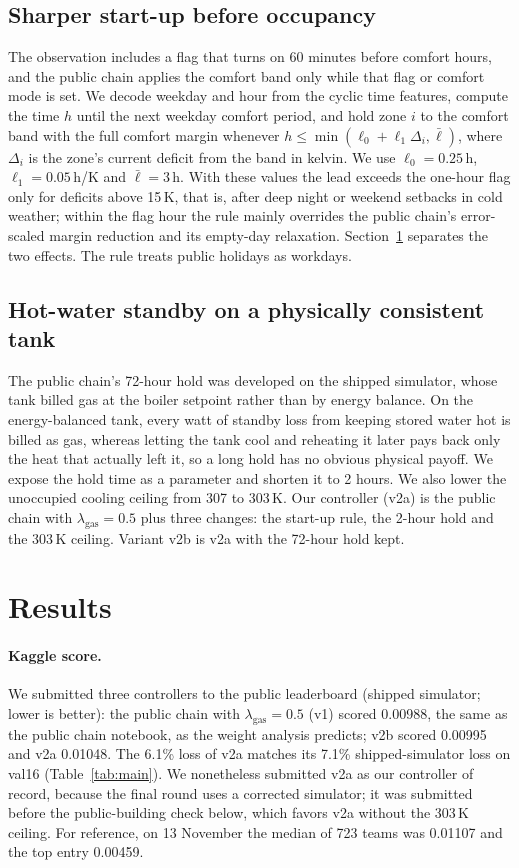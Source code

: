 \documentclass{article}
\begin{document}
\subsection{Sharper start-up before occupancy}
The observation includes a flag that turns on 60 minutes before comfort hours, and the public chain applies the comfort band only while that flag or comfort mode is set. We decode weekday and hour from the cyclic time features, compute the time $h$ until the next weekday comfort period, and hold zone $i$ to the comfort band with the full comfort margin whenever $h \le \min(\ell_0 + \ell_1 \Delta_i, \bar\ell)$, where $\Delta_i$ is the zone's current deficit from the band in kelvin. We use $\ell_0 = 0.25$\,h, $\ell_1 = 0.05$\,h/K and $\bar\ell = 3$\,h. With these values the lead exceeds the one-hour flag only for deficits above 15\,K, that is, after deep night or weekend setbacks in cold weather; within the flag hour the rule mainly overrides the public chain's error-scaled margin reduction and its empty-day relaxation. Section~\ref{sec:results} separates the two effects. The rule treats public holidays as workdays.

\subsection{Hot-water standby on a physically consistent tank}
The public chain's 72-hour hold was developed on the shipped simulator, whose tank billed gas at the boiler setpoint rather than by energy balance. On the energy-balanced tank, every watt of standby loss from keeping stored water hot is billed as gas, whereas letting the tank cool and reheating it later pays back only the heat that actually left it, so a long hold has no obvious physical payoff. We expose the hold time as a parameter and shorten it to 2 hours. We also lower the unoccupied cooling ceiling from 307 to 303\,K. Our controller (v2a) is the public chain with $\lambda_{\mathrm{gas}}=0.5$ plus three changes: the start-up rule, the 2-hour hold and the 303\,K ceiling. Variant v2b is v2a with the 72-hour hold kept.

\section{Results}
\label{sec:results}

\paragraph{Kaggle score.} We submitted three controllers to the public leaderboard (shipped simulator; lower is better): the public chain with $\lambda_{\mathrm{gas}}=0.5$ (v1) scored 0.00988, the same as the public chain notebook, as the weight analysis predicts; v2b scored 0.00995 and v2a 0.01048. The 6.1\% loss of v2a matches its 7.1\% shipped-simulator loss on val16 (Table~\ref{tab:main}). We nonetheless submitted v2a as our controller of record, because the final round uses a corrected simulator; it was submitted before the public-building check below, which favors v2a without the 303\,K ceiling. For reference, on 13 November the median of 723 teams was 0.01107 and the top entry 0.00459.
\end{document}
